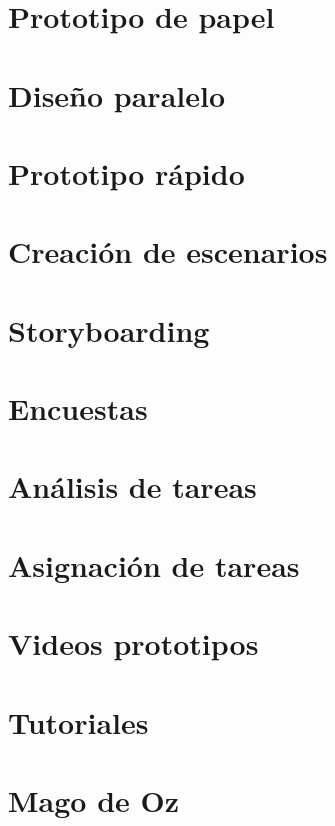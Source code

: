 \documentclass[a4paper]{article}
\begin{document}
\section{Prototipo de papel}

\section{Diseño paralelo}

\section{Prototipo rápido}

\section{Creación de escenarios}

\section{Storyboarding}

\section{Encuestas}

\section{Análisis de tareas}

\section{Asignación de tareas}

\section{Videos prototipos}

\section{Tutoriales}

\section{Mago de Oz}
 
\end{document}
